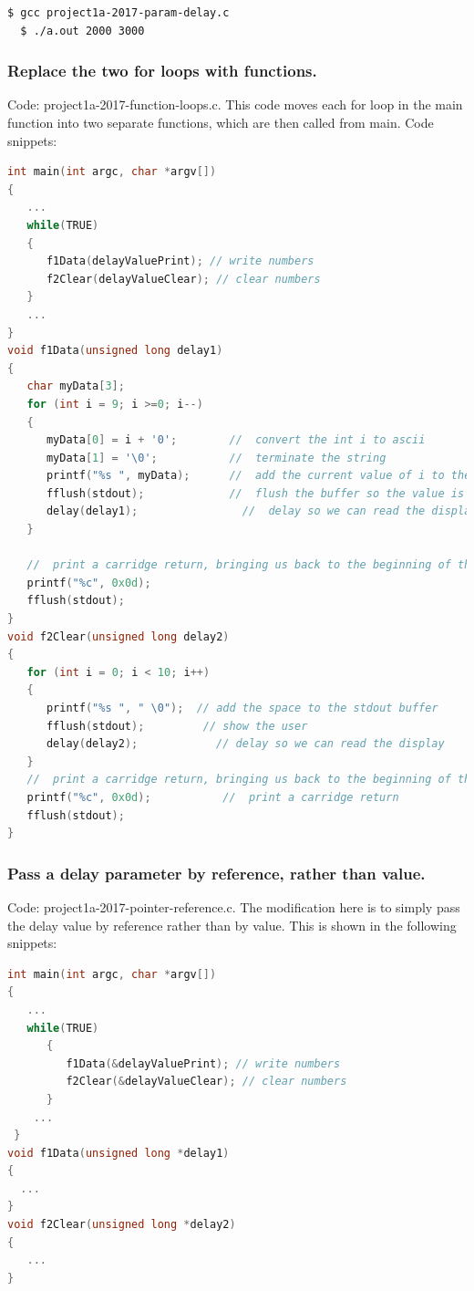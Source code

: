\documentclass[letterpaper, 12pt]{article}
\begin{document}
\begin{lstlisting}[language=bash]
  $ gcc project1a-2017-param-delay.c
  $ ./a.out 2000 3000
\end{lstlisting}

\subsubsection{Replace  the two for loops with  functions.}
Code: project1a-2017-function-loops.c.  This code moves each for loop in the main function into two separate functions, which are then called from main.  Code snippets:
\begin{lstlisting}[language=C]
int main(int argc, char *argv[])
{
   ...
   while(TRUE)
   {
      f1Data(delayValuePrint); // write numbers
      f2Clear(delayValueClear); // clear numbers
   }
   ...
}
void f1Data(unsigned long delay1)
{
   char myData[3];
   for (int i = 9; i >=0; i--)
   {
      myData[0] = i + '0';        //  convert the int i to ascii
      myData[1] = '\0';           //  terminate the string
      printf("%s ", myData);      //  add the current value of i to the stdout buffer
      fflush(stdout);             //  flush the buffer so the value is displayed to the user
      delay(delay1);                //  delay so we can read the display
   }

   //  print a carridge return, bringing us back to the beginning of the output line
   printf("%c", 0x0d);
   fflush(stdout);
}
void f2Clear(unsigned long delay2)
{
   for (int i = 0; i < 10; i++)
   {
      printf("%s ", " \0");  // add the space to the stdout buffer
      fflush(stdout);         // show the user
      delay(delay2);            // delay so we can read the display
   }
   //  print a carridge return, bringing us back to the beginning of the output line
   printf("%c", 0x0d);           //  print a carridge return
   fflush(stdout);
}
\end{lstlisting}

\subsubsection{Pass a delay parameter by reference, rather than value.}
Code: project1a-2017-pointer-reference.c.  The modification here is to simply pass the delay value by reference rather than by value.   This is shown in the following  snippets:
\begin{lstlisting}[language=C]
int main(int argc, char *argv[])
{
   ...
   while(TRUE)
      {
         f1Data(&delayValuePrint); // write numbers
         f2Clear(&delayValueClear); // clear numbers
      }
    ...
 }
void f1Data(unsigned long *delay1)
{
  ...
}
void f2Clear(unsigned long *delay2)
{
   ...
}
\end{lstlisting}
\end{document}
